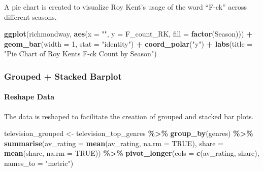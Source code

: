 \documentclass[
]{book}
\newenvironment{Shaded}{\begin{snugshade}}{\end{snugshade}}
\newcommand{\AttributeTok}[1]{\textcolor[rgb]{0.13,0.29,0.53}{#1}}
\newcommand{\ConstantTok}[1]{\textcolor[rgb]{0.56,0.35,0.01}{#1}}
\newcommand{\DecValTok}[1]{\textcolor[rgb]{0.00,0.00,0.81}{#1}}
\newcommand{\FunctionTok}[1]{\textcolor[rgb]{0.13,0.29,0.53}{\textbf{#1}}}
\newcommand{\NormalTok}[1]{#1}
\newcommand{\OtherTok}[1]{\textcolor[rgb]{0.56,0.35,0.01}{#1}}
\newcommand{\SpecialCharTok}[1]{\textcolor[rgb]{0.81,0.36,0.00}{\textbf{#1}}}
\newcommand{\StringTok}[1]{\textcolor[rgb]{0.31,0.60,0.02}{#1}}
\begin{document}
A pie chart is created to visualize Roy Kent's usage of the word ``F-ck'' across different seasons.

\begin{Shaded}
\begin{Highlighting}[]
\FunctionTok{ggplot}\NormalTok{(richmondway, }\FunctionTok{aes}\NormalTok{(}\AttributeTok{x =} \StringTok{""}\NormalTok{, }\AttributeTok{y =}\NormalTok{ F\_count\_RK, }\AttributeTok{fill =} \FunctionTok{factor}\NormalTok{(Season))) }\SpecialCharTok{+}
  \FunctionTok{geom\_bar}\NormalTok{(}\AttributeTok{width =} \DecValTok{1}\NormalTok{, }\AttributeTok{stat =} \StringTok{"identity"}\NormalTok{) }\SpecialCharTok{+}
  \FunctionTok{coord\_polar}\NormalTok{(}\StringTok{"y"}\NormalTok{) }\SpecialCharTok{+}
  \FunctionTok{labs}\NormalTok{(}\AttributeTok{title =} \StringTok{"Pie Chart of Roy Kent\textquotesingle{}s F{-}ck Count by Season"}\NormalTok{)}
\end{Highlighting}
\end{Shaded}

\hypertarget{grouped-stacked-barplot}{%
\subsubsection*{Grouped + Stacked Barplot}\label{grouped-stacked-barplot}}

\hypertarget{reshape-data}{%
\paragraph*{Reshape Data}\label{reshape-data}}

The data is reshaped to facilitate the creation of grouped and stacked bar plots.

\begin{Shaded}
\begin{Highlighting}[]
\NormalTok{television\_grouped }\OtherTok{\textless{}{-}}\NormalTok{ television\_top\_genres }\SpecialCharTok{\%\textgreater{}\%}
  \FunctionTok{group\_by}\NormalTok{(genres) }\SpecialCharTok{\%\textgreater{}\%}
  \FunctionTok{summarise}\NormalTok{(}\AttributeTok{av\_rating =} \FunctionTok{mean}\NormalTok{(av\_rating, }\AttributeTok{na.rm =} \ConstantTok{TRUE}\NormalTok{),}
            \AttributeTok{share =} \FunctionTok{mean}\NormalTok{(share, }\AttributeTok{na.rm =} \ConstantTok{TRUE}\NormalTok{)) }\SpecialCharTok{\%\textgreater{}\%}
  \FunctionTok{pivot\_longer}\NormalTok{(}\AttributeTok{cols =} \FunctionTok{c}\NormalTok{(av\_rating, share), }\AttributeTok{names\_to =} \StringTok{"metric"}\NormalTok{)}
\end{Highlighting}
\end{Shaded}
\end{document}
